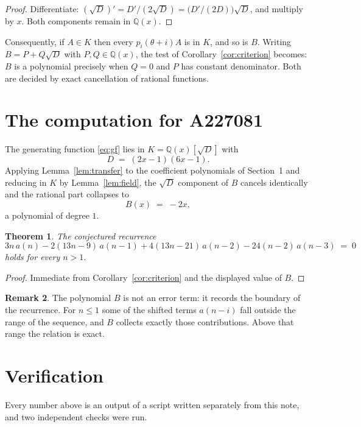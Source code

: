 \documentclass[11pt,a4paper]{article}
\theoremstyle{plain}
\newtheorem{theorem}{Theorem}
\theoremstyle{definition}
\newtheorem{remark}[theorem]{Remark}
\begin{document}
\begin{proof}
Differentiate: $(\sqrt{D})'=D'/(2\sqrt{D})=\bigl(D'/(2D)\bigr)\sqrt{D}$, and multiply by
$x$. Both components remain in $\mathbb{Q}(x)$.
\end{proof}

Consequently, if $A\in K$ then every $p_{i}(\theta+i)A$ is in $K$, and so is $B$. Writing
$B=P+Q\sqrt{D}$ with $P,Q\in\mathbb{Q}(x)$, the test of Corollary~\ref{cor:criterion}
becomes: $B$ is a polynomial precisely when $Q=0$ and $P$ has constant denominator. Both
are decided by exact cancellation of rational functions.

\section{The computation for A227081}

The generating function \eqref{eq:gf} lies in $K=\mathbb{Q}(x)[\sqrt{D}]$ with
\[
D \;=\; \left(2 x - 1\right) \left(6 x - 1\right) .
\]
Applying Lemma~\ref{lem:transfer} to the coefficient polynomials of Section~1 and reducing
in $K$ by Lemma~\ref{lem:field}, the $\sqrt{D}$ component of $B$ cancels identically and
the rational part collapses to
\[
B(x)\;=\;- 2 x ,
\]
a polynomial of degree $1$.

\begin{theorem}
The conjectured recurrence
\[
3 n\,a(n) -  2 \left(13 n - 9\right)\,a(n-1) + 4 \left(13 n - 21\right)\,a(n-2) -  24 \left(n - 2\right)\,a(n-3) \;=\;0
\]
holds for every $n>1$.
\end{theorem}

\begin{proof}
Immediate from Corollary~\ref{cor:criterion} and the displayed value of $B$.
\end{proof}

\begin{remark}
The polynomial $B$ is not an error term: it records the boundary of the recurrence. For
$n\le1$ some of the shifted terms $a(n-i)$ fall outside the range of the sequence,
and $B$ collects exactly those contributions. Above that range the relation is exact.
\end{remark}

\section{Verification}

Every number above is an output of a script written separately from this note, and two
independent checks were run.
\end{document}
